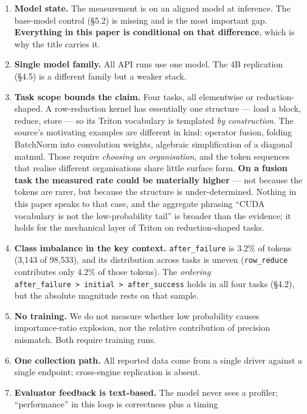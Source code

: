 \documentclass[
  11pt,
]{article}
\providecommand{\tightlist}{%
  \setlength{\itemsep}{0pt}\setlength{\parskip}{0pt}}
\begin{document}
\begin{enumerate}
\def\labelenumi{\arabic{enumi}.}
\tightlist
\item
  \textbf{Model state.} The measurement is on an aligned model at
  inference. The base-model control (§5.2) is missing and is the most
  important gap. \textbf{Everything in this paper is conditional on that
  difference}, which is why the title carries it.
\item
  \textbf{Single model family.} All API runs use one model. The 4B
  replication (§4.5) is a different family but a weaker stack.
\item
  \textbf{Task scope bounds the claim.} Four tasks, all elementwise or
  reduction-shaped. A row-reduction kernel has essentially one structure
  --- load a block, reduce, store --- so its Triton vocabulary is
  templated \emph{by construction}. The source's motivating examples are
  different in kind: operator fusion, folding BatchNorm into convolution
  weights, algebraic simplification of a diagonal matmul. Those require
  \emph{choosing an organisation}, and the token sequences that realise
  different organisations share little surface form. \textbf{On a fusion
  task the measured rate could be materially higher} --- not because the
  tokens are rarer, but because the structure is under-determined.
  Nothing in this paper speaks to that case, and the aggregate phrasing
  ``CUDA vocabulary is not the low-probability tail'' is broader than
  the evidence; it holds for the mechanical layer of Triton on
  reduction-shaped tasks.
\item
  \textbf{Class imbalance in the key context.} \texttt{after\_failure}
  is 3.2\% of tokens (3,143 of 98,533), and its distribution across
  tasks is uneven (\texttt{row\_reduce} contributes only 4.2\% of those
  tokens). The \emph{ordering}
  \texttt{after\_failure\ \textgreater{}\ initial\ \textgreater{}\ after\_success}
  holds in all four tasks (§4.2), but the absolute magnitude rests on
  that sample.
\item
  \textbf{No training.} We do not measure whether low probability causes
  importance-ratio explosion, nor the relative contribution of precision
  mismatch. Both require training runs.
\item
  \textbf{One collection path.} All reported data come from a single
  driver against a single endpoint; cross-engine replication is absent.
\item
  \textbf{Evaluator feedback is text-based.} The model never sees a
  profiler; ``performance'' in this loop is correctness plus a timing

\end{enumerate}
\end{document}
